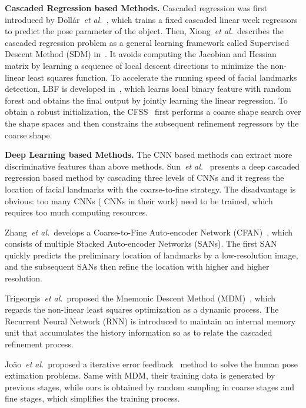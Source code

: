 \documentclass[letterpaper]{article} \usepackage{aaai18}  \usepackage{times}  \usepackage{helvet}  \usepackage{courier}  \usepackage{url}  \usepackage{graphicx}
\def\etal{{\em et al.}}
\begin{document}
{\noindent \textbf{Cascaded Regression based Methods.}} Cascaded regression was first introduced by Doll\'{a}r~\etal~\cite{Dollar:CPR:CVPR2010}, which trains a fixed cascaded linear week regressors to predict the pose parameter of the object. Then, Xiong~\etal~describes the cascaded regression problem as a general learning framework called Supervised Descent Method (SDM) in~\cite{Xiong:SDM:CVPR2013}. It avoids computing the Jacobian and Hessian matrix by learning a sequence of local descent directions to minimize the non-linear least squares function. To accelerate the running speed of facial landmarks detection, LBF is developed in~\cite{ShaoqinRen:LBF:CVPR2014}, which learns local binary feature with random forest\cite{Breiman01:random_forest} and obtains the final output by jointly learning the linear regression. To obtain a robust initialization, the CFSS~\cite{Zhu:CFSS:CVPR2015} first performs a coarse shape search over the shape spaces and then constrains the subsequent refinement regressors by the coarse shape.

{\noindent \textbf{Deep Learning based Methods.}} The CNN based methods can extract more discriminative features than above methods. Sun~\etal~\cite{SunWT:cascaded-cnn:cvpr13} presents a deep cascaded regression based method by cascading three levels of CNNs and it regress the location of facial landmarks with the coarse-to-fine strategy. The disadvantage is obvious: too many CNNs ( CNNs in their work) need to be trained, which requires too much computing resources.

Zhang~\etal~develops a Coarse-to-Fine Auto-encoder Network (CFAN)~\cite{eccv14:ZhangSKC:CFAN}, which consists of multiple Stacked Auto-encoder Networks (SANs). The first SAN quickly predicts the preliminary location of landmarks by a low-resolution image, and the subsequent SANs then refine the location with higher and higher resolution.

Trigeorgis~\etal~proposed the Mnemonic Descent Method (MDM)~\cite{Trigeorgis:MDM:CVPR16}, which regards the non-linear least squares optimization as a dynamic process. The Recurrent Neural Network (RNN) is introduced to maintain an internal memory unit that accumulates the history information so as to relate the cascaded refinement process. 

Jo{\~{a}}o~\etal~proposed a iterative error feedback~\cite{CarreiraAFM:IEF:cvpr16} method to solve the human pose extimation problems. Same with MDM, their training data is generated by previous stages, while ours is obtained by random sampling in coarse stages and fine stages, which simplifies the training process.
\end{document}
